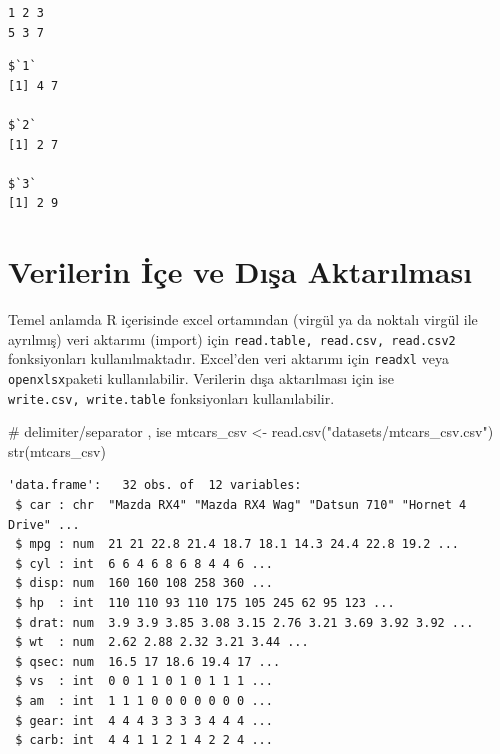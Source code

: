 \documentclass[
  letterpaper,
  DIV=11,
  numbers=noendperiod]{scrreprt}
\newenvironment{Shaded}{\begin{snugshade}}{\end{snugshade}}
\newcommand{\AttributeTok}[1]{\textcolor[rgb]{0.40,0.45,0.13}{#1}}
\newcommand{\CommentTok}[1]{\textcolor[rgb]{0.37,0.37,0.37}{#1}}
\newcommand{\FunctionTok}[1]{\textcolor[rgb]{0.28,0.35,0.67}{#1}}
\newcommand{\NormalTok}[1]{\textcolor[rgb]{0.00,0.23,0.31}{#1}}
\newcommand{\OtherTok}[1]{\textcolor[rgb]{0.00,0.23,0.31}{#1}}
\newcommand{\SpecialCharTok}[1]{\textcolor[rgb]{0.37,0.37,0.37}{#1}}
\newcommand{\StringTok}[1]{\textcolor[rgb]{0.13,0.47,0.30}{#1}}
\begin{document}
\begin{verbatim}
1 2 3 
5 3 7 
\end{verbatim}

\begin{Shaded}
\end{Shaded}

\begin{verbatim}
$`1`
[1] 4 7

$`2`
[1] 2 7

$`3`
[1] 2 9
\end{verbatim}

\hypertarget{verilerin-iuxe7e-ve-dux131ux15fa-aktarux131lmasux131}{%
\chapter{Verilerin İçe ve Dışa
Aktarılması}\label{verilerin-iuxe7e-ve-dux131ux15fa-aktarux131lmasux131}}

Temel anlamda R içerisinde excel ortamından (virgül ya da noktalı virgül
ile ayrılmış) veri aktarımı (import) için
\texttt{read.table,\ read.csv,\ read.csv2} fonksiyonları
kullanılmaktadır. Excel'den veri aktarımı için \texttt{readxl} veya
\texttt{openxlsx}paketi kullanılabilir. Verilerin dışa aktarılması için
ise \texttt{write.csv,\ write.table} fonksiyonları kullanılabilir.

\begin{Shaded}
\begin{Highlighting}[]
\CommentTok{\# delimiter/separator , ise}
\NormalTok{mtcars\_csv }\OtherTok{\textless{}{-}} \FunctionTok{read.csv}\NormalTok{(}\StringTok{"datasets/mtcars\_csv.csv"}\NormalTok{)}
\FunctionTok{str}\NormalTok{(mtcars\_csv)}
\end{Highlighting}
\end{Shaded}

\begin{verbatim}
'data.frame':   32 obs. of  12 variables:
 $ car : chr  "Mazda RX4" "Mazda RX4 Wag" "Datsun 710" "Hornet 4 Drive" ...
 $ mpg : num  21 21 22.8 21.4 18.7 18.1 14.3 24.4 22.8 19.2 ...
 $ cyl : int  6 6 4 6 8 6 8 4 4 6 ...
 $ disp: num  160 160 108 258 360 ...
 $ hp  : int  110 110 93 110 175 105 245 62 95 123 ...
 $ drat: num  3.9 3.9 3.85 3.08 3.15 2.76 3.21 3.69 3.92 3.92 ...
 $ wt  : num  2.62 2.88 2.32 3.21 3.44 ...
 $ qsec: num  16.5 17 18.6 19.4 17 ...
 $ vs  : int  0 0 1 1 0 1 0 1 1 1 ...
 $ am  : int  1 1 1 0 0 0 0 0 0 0 ...
 $ gear: int  4 4 4 3 3 3 3 4 4 4 ...
 $ carb: int  4 4 1 1 2 1 4 2 2 4 ...
\end{verbatim}
\end{document}
